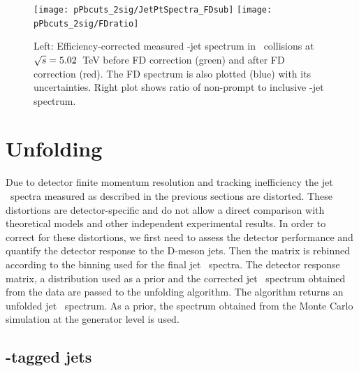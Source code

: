 \begin{figure}[bth]
\centering
\texttt{[image: pPbcuts\_2sig/JetPtSpectra\_FDsub]}
\texttt{[image: pPbcuts\_2sig/FDratio]}
\caption{Left: Efficiency-corrected measured \Dzero-jet spectrum in \pp\ collisions at $\sqrt{s}=5.02$~TeV before FD correction (green) and after FD correction (red). The FD spectrum is also plotted (blue) with its uncertainties. Right plot shows ratio of non-prompt to inclusive \Dzero-jet spectrum.}
\label{fig:pPbFD_corr_Dzero}
\end{figure}



\section{Unfolding}
\label{sect:unfResults}

Due to detector finite momentum resolution and tracking inefficiency the jet \pt\ spectra measured as described
in the previous sections are distorted. These distortions are detector-specific and do not allow a direct comparison
with theoretical models and other independent experimental results.
In order to correct for these distortions, we first need to assess the detector performance and quantify
the detector response to the D-meson jets. 
Then the matrix is rebinned according to the binning used for the final jet \pt\ spectra. The detector response matrix, a distribution used as a prior and the corrected jet \pt\ spectrum obtained from the data are passed to the unfolding algorithm. The algorithm returns an unfolded jet \pt\ spectrum. As a prior, the spectrum obtained from the Monte Carlo simulation at the generator level is used.


\subsection{\Dzero-tagged jets}


